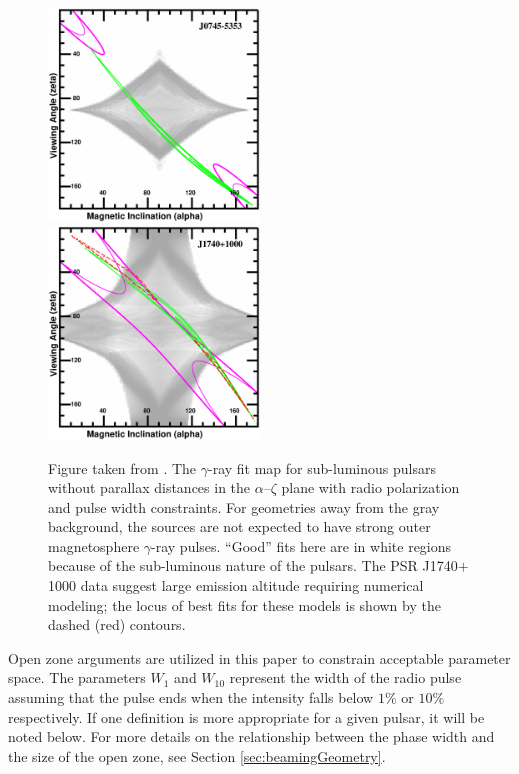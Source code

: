\begin{figure}[t!!]
\includegraphics[width=0.5\textwidth]{chapters/multiWaveLength/figures/f4cor_a.eps}
\includegraphics[width=0.5\textwidth]{chapters/multiWaveLength/figures/f4cor_b.eps}
\caption[The $\gamma$-ray fit map for sub-luminous pulsars without parallax 
distances in the $\alpha$--$\zeta$ plane with radio polarization and pulse
width constraints]{\label{noplx_const} 
Figure taken from \cite{romani2011sub}.
The $\gamma$-ray fit map for sub-luminous pulsars without parallax
distances in the $\alpha$--$\zeta$ plane with radio polarization and pulse
width constraints. For geometries
away from the gray background, the sources are not expected to have strong 
outer magnetosphere $\gamma$-ray pulses. 
``Good'' fits here are in white regions because
of the sub-luminous nature of the pulsars.
The PSR J1740$+$1000 data suggest large
emission altitude requiring numerical modeling; the locus of best fits for these models 
is shown by the dashed (red) contours.
}
\end{figure}
Open zone arguments are utilized 
in this paper to constrain acceptable parameter space.  
The parameters $W_1$ and $W_{10}$ represent the
width of the radio pulse assuming that the pulse
ends when the intensity falls below $1\%$ or $10\%$
respectively.  If one definition is more appropriate
for a given pulsar, it will be noted below.
For more details on the relationship between
the phase width and the size of the open zone, 
see Section \ref{sec:beamingGeometry}.

